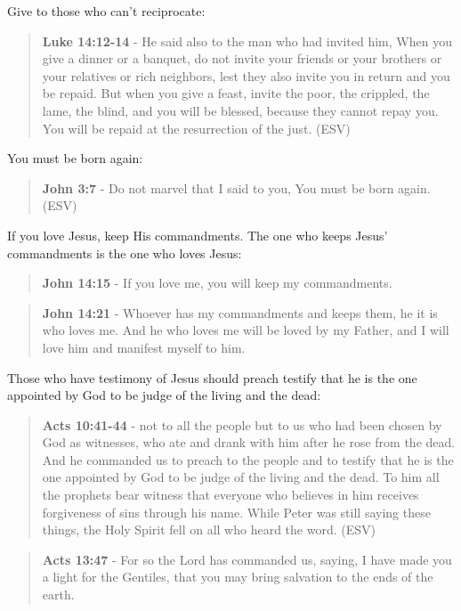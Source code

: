 \documentclass[11pt]{article}
\begin{document}
Give to those who can't reciprocate:

\begin{quote}
\textbf{Luke 14:12-14} - He said also to the man who had invited him, When you give a dinner or a banquet, do not invite your friends or your brothers or your relatives or rich neighbors, lest they also invite you in return and you be repaid. But when you give a feast, invite the poor, the crippled, the lame, the blind, and you will be blessed, because they cannot repay you. You will be repaid at the resurrection of the just. (ESV)
\end{quote}

You must be born again:

\begin{quote}
\textbf{John 3:7} - Do not marvel that I said to you, You must be born again. (ESV)
\end{quote}

If you love Jesus, keep His commandments. The one who keeps Jesus' commandments is the one who loves Jesus:

\begin{quote}
\textbf{John 14:15} - If you love me, you will keep my commandments.
\end{quote}

\begin{quote}
\textbf{John 14:21} - Whoever has my commandments and keeps them, he it is who loves me. And he who loves me will be loved by my Father, and I will love him and manifest myself to him.
\end{quote}

Those who have testimony of Jesus should preach testify that he is the one appointed by God to be judge of the living and the dead:

\begin{quote}
\textbf{Acts 10:41-44} - not to all the people but to us who had been chosen by God as witnesses, who ate and drank with him after he rose from the dead. And he commanded us to preach to the people and to testify that he is the one appointed by God to be judge of the living and the dead. To him all the prophets bear witness that everyone who believes in him receives forgiveness of sins through his name. While Peter was still saying these things, the Holy Spirit fell on all who heard the word. (ESV)
\end{quote}

\begin{quote}
\textbf{Acts 13:47} - For so the Lord has commanded us, saying, I have made you a light for the Gentiles, that you may bring salvation to the ends of the earth.
\end{quote}
\end{document}
